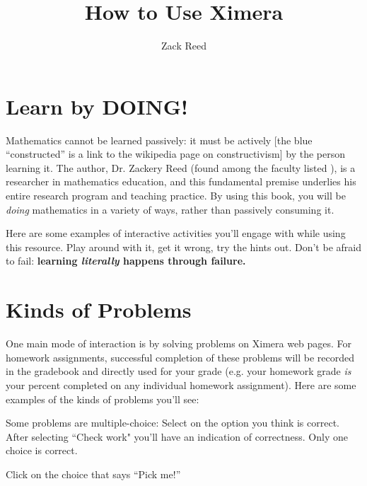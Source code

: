 \documentclass{ximera}
\author{Zack Reed}
\title{How to Use Ximera}
\begin{document}
\begin{abstract}

\end{abstract}
\maketitle


\section*{Learn by DOING!}

Mathematics cannot be learned passively: it must be actively 
 [the blue ``constructed'' is a link to the wikipedia page on constructivism]
by the person learning it. The author, Dr. Zackery Reed (found among the faculty listed ), is a researcher in mathematics education, and this fundamental premise underlies his entire research program and teaching practice. By using this book, you will be \emph{doing} mathematics in a variety of ways, rather than passively consuming it.
 
Here are some examples of interactive activities you'll engage with while using this resource.  Play around with it, get it wrong, try the
hints out.  Don't be afraid to fail: \textbf{learning \emph{literally} happens through failure.}
 
\section*{Kinds of Problems}

One main mode of interaction is by solving problems on Ximera web pages. For homework assignments, successful completion of these problems will be recorded in the gradebook and directly used for your grade (e.g. your homework grade \emph{is} your percent completed on any individual homework assignment).  Here are some examples of the kinds of problems you'll see:
 
\begin{example}
  Some problems are multiple-choice: Select on the option you think is correct. After selecting ``Check work" you'll have an indication of correctness. Only one choice is correct.

  \begin{multipleChoice}
  \end{multipleChoice}
  \begin{feedback}
    Click on the choice that says ``Pick me!''
  \end{feedback}
\end{example}
 
\end{document}
